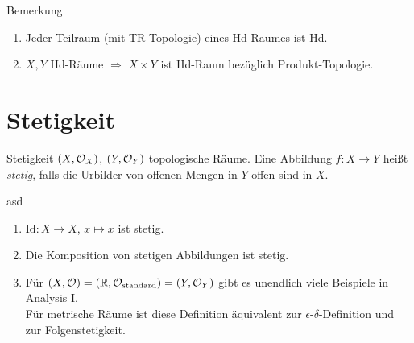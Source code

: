 \begin{bla}{Bemerkung}
  \begin{enumerate}
    \item Jeder Teilraum (mit TR-Topologie) eines Hd-Raumes ist Hd. 
    \item $ X, Y $ Hd-Räume $ \Rightarrow $ $ X \times Y $ ist Hd-Raum bezüglich Produkt-Topologie.
  \end{enumerate}
\end{bla}

\section{Stetigkeit}

\begin{definition}{Stetigkeit}
  $ (X, \mathcal{O}_X) $, $ (Y, \mathcal{O}_Y) $ topologische Räume. Eine Abbildung $ f : X \to Y $ heißt \emph{stetig}, falls die Urbilder von offenen Mengen in $ Y $ offen sind in $ X $.
\end{definition}

\begin{example}{asd}
  \begin{enumerate}
    \item $ \text{Id}: X \to X $, $ x \mapsto x $ ist stetig.
    \item Die Komposition von stetigen Abbildungen ist stetig.
    \item Für $ (X, \mathcal{O}) = (\mathbb{R}, \mathcal{O}_\text{standard}) = (Y, \mathcal{O}_Y) $ gibt es unendlich viele Beispiele in Analysis I. \\
    Für metrische Räume ist diese  Definition äquivalent zur $ \epsilon $-$ \delta $-Definition und zur Folgenstetigkeit.
  \end{enumerate}
\end{example}